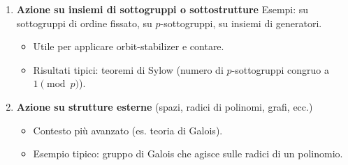 \documentclass[12pt]{scrartcl}
\theoremstyle{style}
\numberwithin{equation}{subsection}
\renewcommand{\textbf}[1]{\textsf{\bfseries #1}}
\begin{document}
\begin{enumerate}
  \item \textbf{Azione su insiemi di sottogruppi o sottostrutture}  
  Esempi: su sottogruppi di ordine fissato, su \(p\)-sottogruppi, su insiemi di generatori.  
  \begin{itemize}
    \item Utile per applicare orbit-stabilizer e contare.  
    \item Risultati tipici: teoremi di Sylow (numero di \(p\)-sottogruppi congruo a \(1 \pmod p\)).
  \end{itemize}

  \item \textbf{Azione su strutture esterne} (spazi, radici di polinomi, grafi, ecc.)  
  \begin{itemize}
    \item Contesto più avanzato (es. teoria di Galois).  
    \item Esempio tipico: gruppo di Galois che agisce sulle radici di un polinomio.
  \end{itemize}
\end{enumerate}
\end{document}
